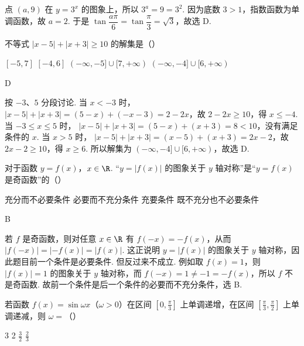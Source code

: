 \begin{solution}
点 \((a,9)\) 在 \(y=3^x\) 的图象上，所以 \(3^a=9=3^2\). 因为底数 \(3>1\)，指数函数为单调函数，故 \(a=2\). 于是
\(\tan\dfrac{a\pi}{6}=\tan\dfrac{\pi}{3}=\sqrt3\)，故选 D.
\end{solution}

\begin{problem}
不等式 \( |x - 5| + |x + 3| \geqslant 10 \) 的解集是（\quad）

\choices
    {\([-5,7]\)}
    {\([-4,6]\)}
    {\((- \infty, -5] \cup [7, +\infty)\)}
    {\((- \infty, -4] \cup [6, +\infty)\)}
\end{problem}

\begin{answer}
D
\end{answer}

\begin{solution}
按 \(-3\)、\(5\) 分段讨论. 当 \(x<-3\) 时，
\(|x-5|+|x+3|=(5-x)+(-x-3)=2-2x\)，故 \(2-2x\geqslant10\)，得 \(x\leqslant-4\).
当 \(-3\leqslant x\leqslant5\) 时，
\(|x-5|+|x+3|=(5-x)+(x+3)=8<10\)，没有满足条件的 \(x\).
当 \(x>5\) 时，
\(|x-5|+|x+3|=(x-5)+(x+3)=2x-2\)，故 \(2x-2\geqslant10\)，得 \(x\geqslant6\).
所以解集为 \((-\infty,-4]\cup[6,+\infty)\)，故选 D.
\end{solution}

\begin{problem}
对于函数 \(y = f(x)\)，\(x \in \R\). “\( y = |f(x)| \) 的图象关于 \( y \) 轴对称”是“\( y = f(x) \) 是奇函数”的（\quad）

\choices
    {充分而不必要条件}
    {必要而不充分条件}
    {充要条件}
    {既不充分也不必要条件}
\end{problem}

\begin{answer}
B
\end{answer}

\begin{solution}
若 \(f\) 是奇函数，则对任意 \(x\in\R\) 有 \(f(-x)=-f(x)\)，从而
\(|f(-x)|=|-f(x)|=|f(x)|\). 这正说明 \(y=|f(x)|\) 的图象关于 \(y\) 轴对称，因此题目前一个条件是必要条件.
但反过来不成立. 例如取 \(f(x)=1\)，则 \(|f(x)|=1\) 的图象关于 \(y\) 轴对称，而 \(f(-x)=1\ne-1=-f(x)\)，所以 \(f\) 不是奇函数.
故前一个条件是后一个条件的必要而不充分条件，选 B.
\end{solution}

\begin{problem}
若函数 \( f(x) = \sin \omega x \)（\(\omega > 0\)）在区间 \(\left[0, \frac{\pi}{3}\right]\) 上单调递增，在区间 \(\left[\frac{\pi}{3}, \frac{\pi}{2}\right]\) 上单调递减，则 \(\omega =\)（\quad）

\choices
    {3}
    {2}
    {\(\frac{3}{2}\)}
    {\(\frac{2}{3}\)}
\end{problem}

